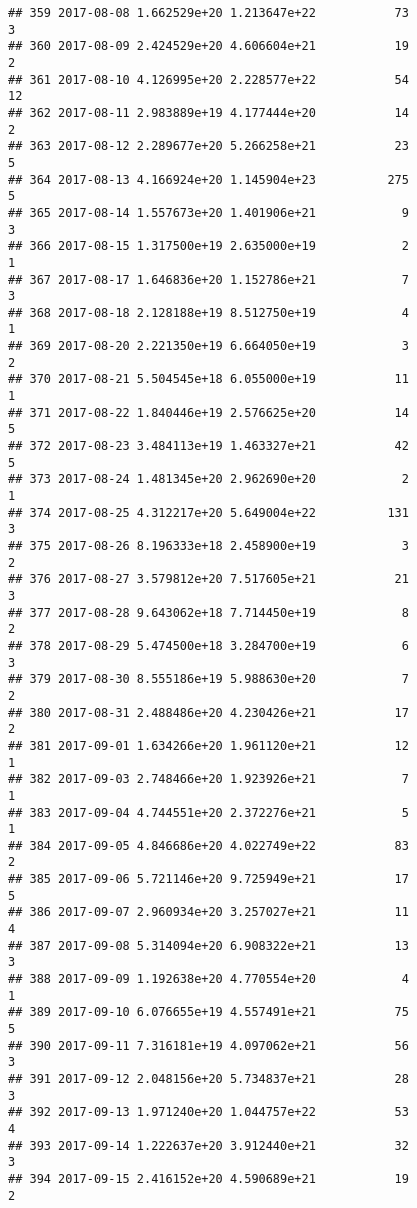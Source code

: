 \documentclass[]{article}
\begin{document}
\begin{verbatim}
## 359 2017-08-08 1.662529e+20 1.213647e+22           73               3
## 360 2017-08-09 2.424529e+20 4.606604e+21           19               2
## 361 2017-08-10 4.126995e+20 2.228577e+22           54              12
## 362 2017-08-11 2.983889e+19 4.177444e+20           14               2
## 363 2017-08-12 2.289677e+20 5.266258e+21           23               5
## 364 2017-08-13 4.166924e+20 1.145904e+23          275               5
## 365 2017-08-14 1.557673e+20 1.401906e+21            9               3
## 366 2017-08-15 1.317500e+19 2.635000e+19            2               1
## 367 2017-08-17 1.646836e+20 1.152786e+21            7               3
## 368 2017-08-18 2.128188e+19 8.512750e+19            4               1
## 369 2017-08-20 2.221350e+19 6.664050e+19            3               2
## 370 2017-08-21 5.504545e+18 6.055000e+19           11               1
## 371 2017-08-22 1.840446e+19 2.576625e+20           14               5
## 372 2017-08-23 3.484113e+19 1.463327e+21           42               5
## 373 2017-08-24 1.481345e+20 2.962690e+20            2               1
## 374 2017-08-25 4.312217e+20 5.649004e+22          131               3
## 375 2017-08-26 8.196333e+18 2.458900e+19            3               2
## 376 2017-08-27 3.579812e+20 7.517605e+21           21               3
## 377 2017-08-28 9.643062e+18 7.714450e+19            8               2
## 378 2017-08-29 5.474500e+18 3.284700e+19            6               3
## 379 2017-08-30 8.555186e+19 5.988630e+20            7               2
## 380 2017-08-31 2.488486e+20 4.230426e+21           17               2
## 381 2017-09-01 1.634266e+20 1.961120e+21           12               1
## 382 2017-09-03 2.748466e+20 1.923926e+21            7               1
## 383 2017-09-04 4.744551e+20 2.372276e+21            5               1
## 384 2017-09-05 4.846686e+20 4.022749e+22           83               2
## 385 2017-09-06 5.721146e+20 9.725949e+21           17               5
## 386 2017-09-07 2.960934e+20 3.257027e+21           11               4
## 387 2017-09-08 5.314094e+20 6.908322e+21           13               3
## 388 2017-09-09 1.192638e+20 4.770554e+20            4               1
## 389 2017-09-10 6.076655e+19 4.557491e+21           75               5
## 390 2017-09-11 7.316181e+19 4.097062e+21           56               3
## 391 2017-09-12 2.048156e+20 5.734837e+21           28               3
## 392 2017-09-13 1.971240e+20 1.044757e+22           53               4
## 393 2017-09-14 1.222637e+20 3.912440e+21           32               3
## 394 2017-09-15 2.416152e+20 4.590689e+21           19               2

\end{verbatim}
\end{document}

